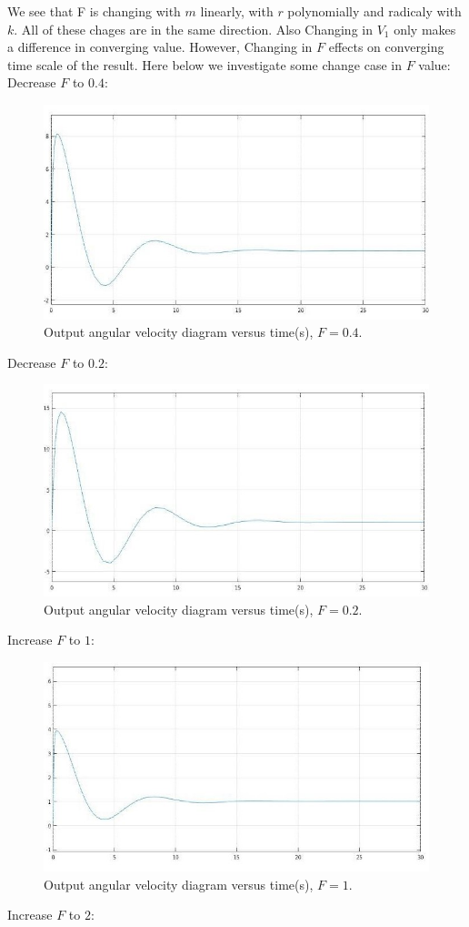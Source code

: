 \documentclass[11pt]{scrartcl} %
\begin{document}
We see that F is changing with $m$ linearly, with $r$ polynomially and radicaly with $k$. All of these chages are in the same direction. Also Changing in $V_1$ only makes a difference in converging value. However, Changing in $F$ effects on converging time scale of the result. Here below  we investigate some change case in $F$ value:\\
\newline
Decrease $F$ to $0.4$:
\begin{figure}[h] 
	\centering
	\includegraphics[width=0.55\columnwidth]{images/p12.jpg}
	\caption{Output angular velocity diagram versus time(s), $F = 0.4$.}
\end{figure}
\newpage
Decrease $F$ to $0.2$:
\begin{figure}[h] 
	\centering
	\includegraphics[width=0.55\columnwidth]{images/p11.jpg}
	\caption{Output angular velocity diagram versus time(s), $F = 0.2$.}
\end{figure} \newline
Increase $F$ to $1$:
\begin{figure}[h] 
	\centering
	\includegraphics[width=0.55\columnwidth]{images/p13.jpg}
	\caption{Output angular velocity diagram versus time(s), $F = 1$.}
\end{figure}
\newline Increase $F$ to $2$:
\end{document}
